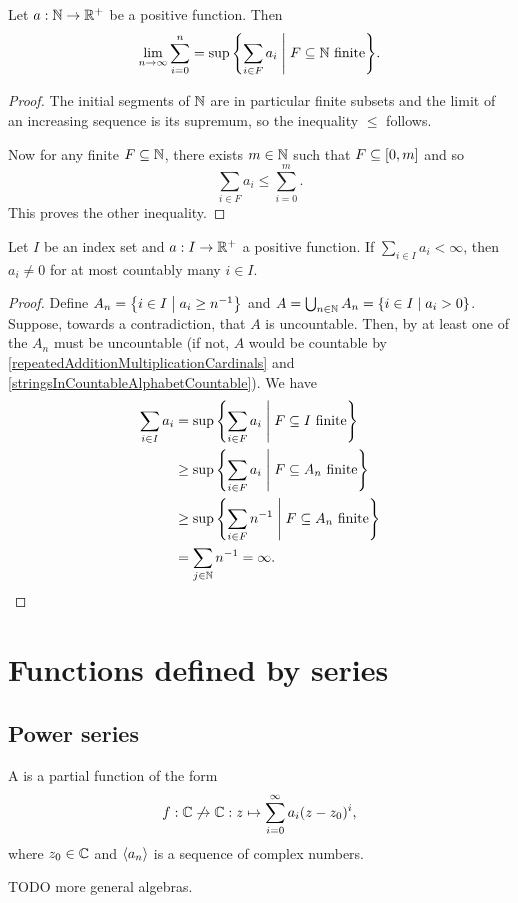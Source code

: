 \begin{lemma}
Let $a: \mathbb{N}\to \mathbb{R}^+$ be a positive function. Then
\[ \lim_{n\to\infty}\sum_{i=0}^n = \sup\setbuilder{\sum_{i\in F}a_i}{\text{$F\subseteq \N$ finite}}. \]
\end{lemma}
\begin{proof}
The initial segments of $\mathbb{N}$ are in particular finite subsets and the limit of an increasing sequence is its supremum, so the inequality $\leq$ follows.

Now for any finite $F\subseteq \mathbb{N}$, there exists $m\in \mathbb{N}$ such that $F\subseteq \interval{0,m}$ and so
\[ \sum_{i\in F}a_i \leq \sum_{i=0}^m. \]
This proves the other inequality.
\end{proof}


\begin{proposition} \label{finiteSumsAreCountable}
Let $I$ be an index set and $a: I\to \mathbb{R}^+$ a positive function. If $\sum_{i\in I}a_i < \infty$, then $a_i\neq 0$ for at most countably many $i\in I$.
\end{proposition}
\begin{proof}
Define $A_n = \setbuilder{i\in I}{a_i \geq n^{-1}}$ and $A = \bigcup_{n\in \N}A_n = \setbuilder{i\in I}{a_i > 0}$. Suppose, towards a contradiction, that $A$ is uncountable. Then, by at least one of the $A_n$ must be uncountable (if not, $A$ would be countable by \ref{repeatedAdditionMultiplicationCardinals} and \ref{stringsInCountableAlphabetCountable}). We have
\begin{align*}
\sum_{i\in I}a_i &= \sup\setbuilder{\sum_{i\in F}a_i}{\text{$F\subseteq I$ finite}} \\
&\geq \sup\setbuilder{\sum_{i\in F}a_i}{\text{$F\subseteq A_n$ finite}} \\
&\geq \sup\setbuilder{\sum_{i\in F}n^{-1}}{\text{$F\subseteq A_n$ finite}} \\
&= \sum_{j\in \N}n^{-1} = \infty.
\end{align*}
\end{proof}

\section{Functions defined by series}
\subsection{Power series}
\begin{definition}
A  is a partial function of the form
\[ f: \mathbb{C}\not\to \mathbb{C}: z\mapsto \sum_{i=0}^\infty a_i(z-z_0)^i, \]
where $z_0\in \mathbb{C}$ and $\left\langle a_n \right\rangle$ is a sequence of complex numbers. 
\end{definition}
TODO more general algebras.

